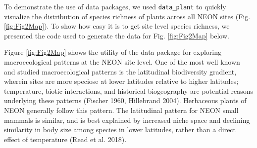 \documentclass[
  12pt,
]{article}
\newenvironment{Shaded}{\begin{snugshade}}{\end{snugshade}}
\newcommand{\AttributeTok}[1]{\textcolor[rgb]{0.77,0.63,0.00}{#1}}
\newcommand{\CommentTok}[1]{\textcolor[rgb]{0.56,0.35,0.01}{\textit{#1}}}
\newcommand{\FunctionTok}[1]{\textcolor[rgb]{0.00,0.00,0.00}{#1}}
\newcommand{\NormalTok}[1]{#1}
\newcommand{\OtherTok}[1]{\textcolor[rgb]{0.56,0.35,0.01}{#1}}
\newcommand{\SpecialCharTok}[1]{\textcolor[rgb]{0.00,0.00,0.00}{#1}}
\newcommand{\StringTok}[1]{\textcolor[rgb]{0.31,0.60,0.02}{#1}}
\begin{document}
To demonstrate the use of data packages, we used \texttt{data\_plant} to quickly visualize the distribution of species richness of plants across all NEON sites (Fig. \ref{fig:Fig2Map}). To show how easy it is to get site level species richness, we presented the code used to generate the data for Fig. \ref{fig:Fig2Map} below.

\begin{Shaded}
\end{Shaded}

Figure \ref{fig:Fig2Map} shows the utility of the data package for exploring macroecological patterns at the NEON site level. One of the most well known and studied macroecological patterns is the latitudinal biodiversity gradient, wherein sites are more speciose at lower latitudes relative to higher latitudes; temperature, biotic interactions, and historical biogeography are potential reasons underlying these patterns (Fischer 1960, Hillebrand 2004). Herbaceous plants of NEON generally follow this pattern. The latitudinal pattern for NEON small mammals is similar, and is best explained by increased niche space and declining similarity in body size among species in lower latitudes, rather than a direct effect of temperature (Read et al. 2018).
\end{document}
